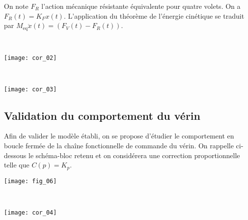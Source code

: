 On note $F_R$ l'action mécanique résistante équivalente pour quatre volets. On a $F_R(t) = K_F x(t)$. L'application du théorème de l'énergie cinétique se traduit par $M_{\text{eq}}\ddot{x}(t)=\left(F_V(t)-F_R(t)\right)$. 
\fi

\ifprof
\begin{corrige} ~\\
\begin{center}
\texttt{[image: cor\_02]}
\end{center}
\end{corrige}
\else
\fi

\ifprof
\begin{corrige} ~\\
\begin{center}
\texttt{[image: cor\_03]}
\end{center}
\end{corrige}
\else
\fi

\subsection*{Validation du comportement du vérin} 

\ifprof
\else

Afin de valider le modèle établi, on se propose d'étudier le comportement en boucle fermée de la chaîne fonctionnelle de commande du vérin. On rappelle ci-dessous le schéma-bloc retenu et on considérera une correction proportionnelle telle que  $C(p)=K_p$.

\begin{center}
\texttt{[image: fig\_06]}
\end{center}
\fi

\ifprof
\begin{corrige} ~\\
\begin{center}
\texttt{[image: cor\_04]}
\end{center}
\end{corrige}
\else
\fi

